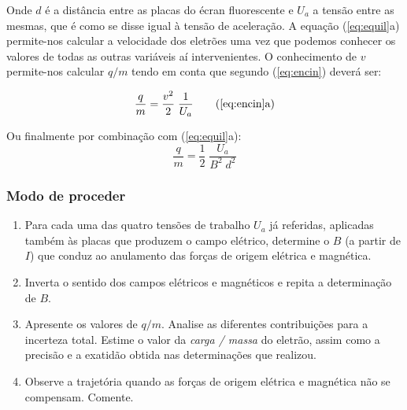 \documentclass[a4paper,twoside,12pt]{article}      %
\begin{document}
Onde $d$ é a distância entre as placas do écran fluorescente e $U_a$ a tensão entre as mesmas, que é como se disse igual à tensão de aceleração. A equação (\ref{eq:equil}a) permite-nos calcular a velocidade dos eletrões uma vez que podemos conhecer os valores de todas as outras variáveis aí intervenientes. O conhecimento de $v$ permite-nos calcular $q/m$ tendo em conta que segundo (\ref{eq:encin}) deverá ser:

\begin{equation*}
\frac{q}{m} = \frac{v^2}{2} \; \frac{1}{U_a} \qquad \textrm{(\ref{eq:encin}a)}
\end{equation*}

Ou finalmente por combinação com (\ref{eq:equil}a):
\begin{equation}
\frac{q}{m} = \frac{1}{2} \; \frac{U_a}{B^2\; d^2} 
\end{equation}

\subsubsection{\sf Modo de proceder}
\begin{enumerate}
	\item Para cada uma das quatro tensões de trabalho $U_a$ já referidas, aplicadas também às placas que produzem o campo elétrico, determine o $B$ (a partir de $I$) que conduz ao anulamento das forças de origem elétrica e magnética.
	\item Inverta o sentido dos campos elétricos e magnéticos e repita a determinação de $B$.
	\item Apresente os valores de $q/m$. Analise as diferentes contribuições para a incerteza total. Estime o valor da \emph{carga / massa } do eletrão, assim como a precisão e a exatidão obtida nas determinações que realizou.
	\item  Observe  a  trajetória  quando  as  forças  de 
origem elétrica e magnética não se compensam. Comente. 
\end{enumerate}
\end{document}
